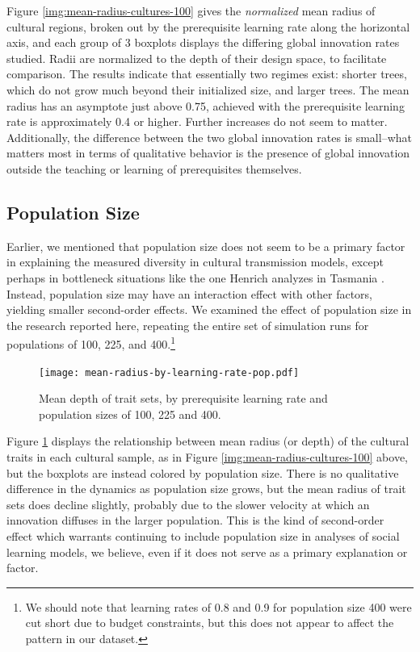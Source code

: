 \documentclass[referee,graybox,natbib]{svmult}
\begin{document}
Figure \ref{img:mean-radius-cultures-100} gives the \emph{normalized}
mean radius of cultural regions, broken out by the prerequisite learning
rate along the horizontal axis, and each group of 3 boxplots displays
the differing global innovation rates studied. Radii are normalized to
the depth of their design space, to facilitate comparison. The results
indicate that essentially two regimes exist: shorter trees, which do not
grow much beyond their initialized size, and larger trees. The mean
radius has an asymptote just above 0.75, achieved with the prerequisite
learning rate is approximately 0.4 or higher. Further increases do not
seem to matter. Additionally, the difference between the two global
innovation rates is small--what matters most in terms of qualitative
behavior is the presence of global innovation outside the teaching or
learning of prerequisites themselves.

\subsection{Population Size}\label{population-size}

Earlier, we mentioned that population size does not seem to be a primary
factor in explaining the measured diversity in cultural transmission
models, except perhaps in bottleneck situations like the one Henrich
analyzes in Tasmania \citeyearpar{henrich2004}. Instead, population size
may have an interaction effect with other factors, yielding smaller
second-order effects. We examined the effect of population size in the
research reported here, repeating the entire set of simulation runs for
populations of 100, 225, and 400.\footnote{We should note that learning
  rates of 0.8 and 0.9 for population size 400 were cut short due to
  budget constraints, but this does not appear to affect the pattern in
  our dataset.}

\begin{figure}[h] 
\centering 
\texttt{[image: mean-radius-by-learning-rate-pop.pdf]} 
\caption{Mean depth of trait sets, by prerequisite learning rate and population sizes of 100, 225 and 400.} 
\label{img:mean-radius-cultures-pop} 
\end{figure}

Figure \ref{img:mean-radius-cultures-pop} displays the relationship
between mean radius (or depth) of the cultural traits in each cultural
sample, as in Figure \ref{img:mean-radius-cultures-100} above, but the
boxplots are instead colored by population size. There is no qualitative
difference in the dynamics as population size grows, but the mean radius
of trait sets does decline slightly, probably due to the slower velocity
at which an innovation diffuses in the larger population. This is the
kind of second-order effect which warrants continuing to include
population size in analyses of social learning models, we believe, even
if it does not serve as a primary explanation or factor.
\end{document}
